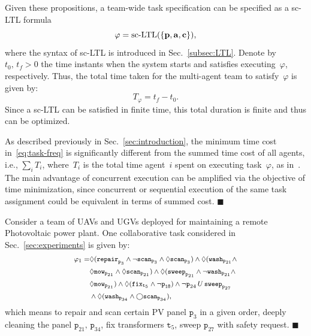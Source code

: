 Given these propositions, a team-wide task specification can be specified as a sc-LTL formula
\begin{equation}\label{eq:task}
\varphi=\textup{sc-LTL}(\{\mathbf{p}, \mathbf{a}, \mathbf{c}\}),
\end{equation}
where the syntax of sc-LTL is introduced in Sec.~\ref{subsec:LTL}.
Denote by~$t_0,\, t_f>0$ the time instants when the system starts
and satisfies executing~$\varphi$, respectively.
Thus, the total time taken for the multi-agent team to satisfy~$\varphi$ is given by:
\begin{equation}\label{eq:task-freq}
T_\varphi = t_f-t_0.
\end{equation}
Since a sc-LTL can be satisfied in finite time, this total duration is finite and thus can be optimized.


\begin{remark}\label{rm:cost}
  As described previously in Sec.~\ref{sec:introduction}, the minimum time cost in~\eqref{eq:task-freq} is significantly different from the summed time cost of all agents, i.e.,
$\sum_{i} T_i$, where~$T_i$ is the total time agent~$i$ spent on executing task~$\varphi$,
as in~\citep{kantaros2020stylus, schillinger2018simultaneous, guo2016task, luo2021temporal}.
The main advantage of concurrent execution can be amplified via
the objective of time minimization,
since concurrent or sequential execution of the same task assignment could
be equivalent in terms of summed cost.
\hfill $\blacksquare$
\end{remark}
\begin{example}\label{exp:task}
Consider a team of UAVs and UGVs deployed for maintaining a remote Photovoltaic power plant.
One collaborative task considered in Sec.~\ref{sec:experiments} is given by:
\begin{equation}\footnotesize
\label{example:task}
\begin{aligned}
\varphi_1 = & \Diamond(\texttt{repair}_{\texttt{p}_{3}} \wedge \lnot \texttt{scan}_{\texttt{p}_3} \wedge\Diamond \texttt{scan}_{\texttt{p}_3})
\wedge \Diamond (\texttt{wash}_{\texttt{p}_{21}} \wedge \\
&\Diamond \texttt{mow}_{\texttt{p}_{21}} \wedge \Diamond \texttt{scan}_{\texttt{p}_{21}}) \wedge \Diamond ( \texttt{sweep}_{\texttt{p}_{21}} \wedge \lnot \texttt{wash}_{\texttt{p}_{21}} \wedge\\
& \Diamond \texttt{mow}_{\texttt{p}_{21}}) \wedge \Diamond(\texttt{fix}_{\texttt{t}_5} \wedge \lnot \texttt{p}_{\texttt{18}}) \wedge \lnot \texttt{p}_{24} \,U \, \texttt{sweep}_{\texttt{p}_{27}} \\
&\wedge \Diamond (\texttt{wash}_{\texttt{p}_{34}} \wedge \bigcirc \texttt{scan}_{\texttt{p}_{34}}),
\end{aligned}
\end{equation}
which means to repair and scan certain PV panel $\texttt{p}_3$
in a given order, deeply cleaning the panel $\texttt{p}_{21},\, \texttt{p}_{34}$, fix transformers
$\texttt{t}_5$, sweep $\texttt{p}_{27}$ with safety request.
 \hfill $\blacksquare$
\end{example}

